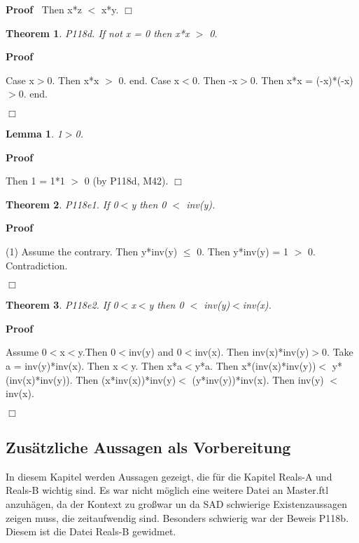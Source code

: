 \documentclass{article}
\newenvironment{forthel}{\begin{leftbar}}{\end{leftbar}}
\newenvironment{proof}{\noindent\textbf{Proof\ }}{\hspace*{\fill}$\Box$\medskip}
\newtheorem{lemma}{Lemma}
\newtheorem{theorem}{Theorem}
\begin{document}
\begin{forthel}
\begin{proof}
	Then x*z $<$ x*y.
	\end{proof}

	
	\begin{theorem}
 P118d. If not x = 0 then x*x $>$ 0.
\end{theorem}	\begin{proof}

	Case x$>$0. Then x*x $>$ 0.
	end.
	Case x$<$0. Then -x$>$0. Then x*x = (-x)*(-x)$>$0.
	end.
	
	\end{proof}

	\begin{lemma} 1$>$0. 

\end{lemma}
	\begin{proof}

	Then 1 = 1*1 $>$ 0 (by P118d, M42).
	\end{proof}

	
	\begin{theorem}
 P118e1. If 0$<$y then 0 $<$ inv(y).
\end{theorem}	\begin{proof}

	(1) Assume the contrary.
	Then y*inv(y) $\leq$ 0.
	Then y*inv(y) = 1 $>$ 0.
	Contradiction.
	
	\end{proof}

	\begin{theorem}
 P118e2. If 0$<$x$<$y then 0 $<$ inv(y)$<$inv(x).
\end{theorem}	\begin{proof}
 
	Assume 0$<$x$<$y.Then 0$<$inv(y) and 0$<$inv(x).
	Then inv(x)*inv(y)$>$0.
	Take a = inv(y)*inv(x).	
	Then x$<$y. Then x*a$<$y*a.
	Then x*(inv(x)*inv(y))$<$ y*(inv(x)*inv(y)).
	Then (x*inv(x))*inv(y)$<$ (y*inv(y))*inv(x).
	Then inv(y) $<$ inv(x).
	
	\end{proof}

	

\end{forthel}








\subsection{Zus\"atzliche Aussagen als Vorbereitung}
In diesem Kapitel werden Aussagen gezeigt, die f\"ur die Kapitel Reals-A und Reals-B wichtig sind.
Es war nicht m\"oglich eine weitere Datei an Master.ftl anzuh\"agen, da der Kontext zu gro\ss \enspace war
un da SAD schwierige Existenzaussagen zeigen muss, die zeitaufwendig sind. Besonders schwierig war der Beweis P118b. Diesem ist die Datei Reals-B gewidmet.
 
\end{document}
